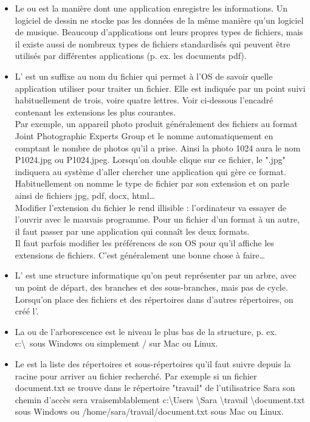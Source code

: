 \documentclass[10pt,a4paper]{report}
\begin{document}
\begin{itemize}
	\item Le  ou  est la manière dont une application enregistre les informations. Un logiciel de dessin ne stocke pas les données de la même manière qu'un logiciel de musique. Beaucoup d'applications ont leurs propres types de fichiers, mais il existe aussi de nombreux types de fichiers standardisés qui peuvent être utilisés par différentes applications (p. ex. les documents pdf).
	\item L' est un suffixe au nom du fichier qui permet à l'OS de savoir quelle application utiliser pour traiter un fichier. Elle est indiquée par un point suivi habituellement de trois, voire quatre lettres. Voir ci-dessous l'encadré contenant les extensions les plus courantes. \\[1ex]
		Par exemple, un appareil photo produit généralement des fichiers au format Joint Photographic Experts Group et le nomme automatiquement en comptant le nombre de photos qu'il a prise. Ainsi la photo 1024 aura le nom P1024.jpg ou P1024.jpeg. Lorsqu'on double clique sur ce fichier, le ".jpg" indiquera au système d'aller chercher une application qui gère ce format. \\[1ex]
		Habituellement on nomme le type de fichier par son extension et on parle ainsi de fichiers jpg, pdf, docx, html\dots \\[1ex]
		\attention Modifier l'extension du fichier le rend illisible : l'ordinateur va essayer de l'ouvrir avec le mauvais programme. Pour  un fichier d'un format à un autre, il faut passer par une application qui connaît les deux formats. \\[1ex]
		\attention Il faut parfois modifier les préférences de son OS pour qu'il affiche les extensions de fichiers. C'est généralement une bonne chose à faire\dots
	\item L' est une structure informatique qu'on peut représenter par un arbre, avec un point de départ, des branches et des sous-branches, mais pas de cycle. Lorsqu'on place des fichiers et des répertoires dans d'autres répertoires, on créé l'.
	\item La  ou  de l'arborescence est le niveau le plus bas de la structure, p. ex. c:\textbackslash \ sous Windows ou simplement / sur Mac ou Linux.
	\item Le  est la liste des répertoires et sous-répertoires qu'il faut suivre depuis la racine pour arriver au fichier recherché. Par exemple si un fichier document.txt se trouve dans le répertoire "travail" de l'utilisatrice Sara son chemin d'accès sera vraisemblablement c:\textbackslash Users \textbackslash Sara \textbackslash travail \textbackslash document.txt sous Windows ou /home/sara/travail/document.txt sous Mac ou Linux.
\end{itemize}
\end{document}
